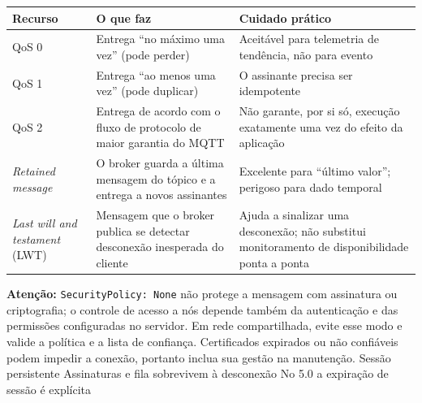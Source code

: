 \begin{longtable}[]{@{}
  >{\raggedright\arraybackslash}p{}
  >{\raggedright\arraybackslash}p{}
  >{\raggedright\arraybackslash}p{}@{}}
\toprule\noalign{}
\begin{minipage}[b]{\linewidth}\raggedright
Recurso
\end{minipage} & \begin{minipage}[b]{\linewidth}\raggedright
O que faz
\end{minipage} & \begin{minipage}[b]{\linewidth}\raggedright
Cuidado prático
\end{minipage} \\
\midrule\noalign{}
\endhead
\bottomrule\noalign{}
\endlastfoot
QoS 0 & Entrega ``no máximo uma vez'' (pode perder) & Aceitável para telemetria de tendência, não para evento \\
QoS 1 & Entrega ``ao menos uma vez'' (pode duplicar) & O assinante precisa ser idempotente \\
QoS 2 & Entrega de acordo com o fluxo de protocolo de maior garantia do MQTT & Não garante, por si só, execução exatamente uma vez do efeito da aplicação \\
\emph{Retained message} & O broker guarda a última mensagem do tópico e a entrega a novos assinantes & Excelente para ``último valor''; perigoso para dado temporal \\
\emph{Last will and testament} (LWT) & Mensagem que o broker publica se detectar desconexão inesperada do cliente & Ajuda a sinalizar uma desconexão; não substitui monitoramento de disponibilidade ponta a ponta \\
\end{longtable}

\begin{caixaatencao}

\textbf{Atenção:} \passthrough{\lstinline!SecurityPolicy: None!} não protege a mensagem com assinatura ou criptografia; o controle de acesso a nós depende também da autenticação e das permissões configuradas no servidor. Em rede compartilhada, evite esse modo e valide a política e a lista de confiança. Certificados expirados ou não confiáveis podem impedir a conexão, portanto inclua sua gestão na manutenção.
\textbar{} Sessão persistente \textbar{} Assinaturas e fila sobrevivem à desconexão \textbar{} No 5.0 a expiração de sessão é explícita \textbar{}

\end{caixaatencao}

